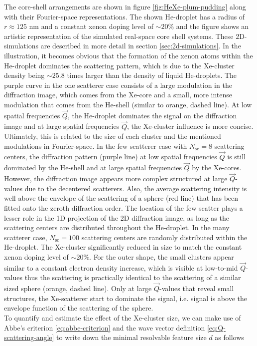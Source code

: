 The core-shell arrangements are shown in figure \ref{fig:HeXe-plum-pudding} along with their Fourier-space representations. The shown He-droplet has a radius of $r\approx 125$ nm and a constant xenon doping level of $\sim 20\%$ and the figure shows an artistic representation of the simulated real-space core shell systems. These 2D-simulations are described in more detail in section \ref{sec:2d-simulations}. In the illustration, it becomes obvious that the formation of the xenon atoms within the He-droplet dominates the scattering pattern, which is due to the Xe-cluster density being $\sim 25.8$ times larger than the density of liquid He-droplets. The purple curve in the one scatterer case consists of a large modulation in the diffraction image, which comes from the Xe-core and a small, more intense modulation that comes from the He-shell (similar to orange, dashed line). At low spatial frequencies $\vec{Q}$, the He-droplet dominates the signal on the diffraction image and at large spatial frequencies $\vec{Q}$, the Xe-cluster influence is more concise. Ultimately, this is related to the size of each cluster and the mentioned modulations in Fourier-space. In the few scatterer case with $N_{\text{sc}}=8$ scattering centers, the diffraction pattern (purple line) at low spatial frequencies $\vec{Q}$ is still dominated by the He-shell and at large spatial frequencies $\vec{Q}$ by the Xe-cores. However, the diffraction image appears more complex structured at large $\vec{Q}$-values due to the decentered scatterers. Also, the average scattering intensity is well above the envelope of the scattering of a sphere (red line) that has been fitted onto the zeroth diffraction order. The location of the few scatter plays a lesser role in the 1D projection of the 2D diffraction image, as long as the scattering centers are distributed throughout the He-droplet. In the many scatterer case, $N_{\text{sc}}=100$ scattering centers are randomly distributed within the He-droplet. The Xe-cluster significantly reduced in size to match the constant xenon doping level of $\sim 20 \%$. For the outer shape, the small clusters appear similar to a constant electron density increase, which is visible at low-to-mid $\vec{Q}$-values thus the scattering is practically identical to the scattering of a similar sized sphere (orange, dashed line). Only at large $\vec{Q}$-values that reveal small structures, the Xe-scatterer start to dominate the signal, i.e. signal is above the envelope function of the scattering of the sphere.\\
To quantify and estimate the effect of the Xe-cluster size, we can make use of Abbe's criterion \eqref{eq:abbe-criterion} and the wave vector definition \eqref{eq:Q-scattering-angle} to write down the minimal resolvable feature size $d$ as follows
